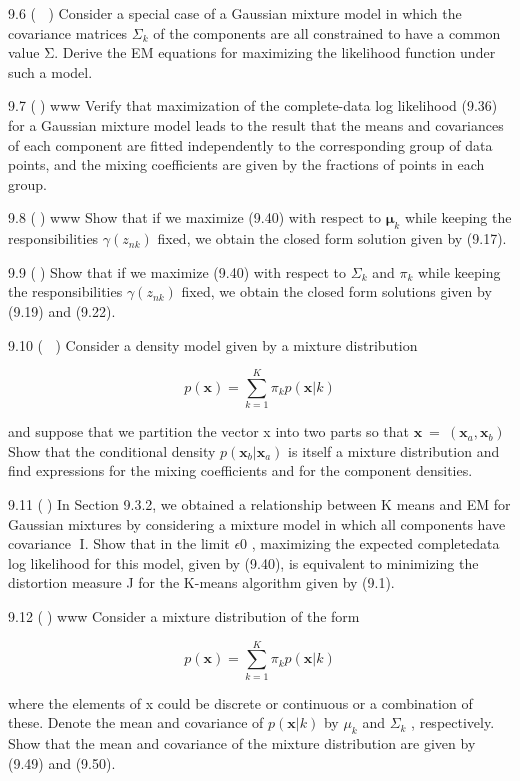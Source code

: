 \documentclass[
  10
]{article}
\begin{document}
9.6 ( ) Consider a special case of a Gaussian mixture model in which the
covariance matrices \(\Sigma _ { k }\) of the components are all
constrained to have a common value Σ. Derive the EM equations for
maximizing the likelihood function under such a model.

9.7 () www Verify that maximization of the complete-data log likelihood
(9.36) for a Gaussian mixture model leads to the result that the means
and covariances of each component are fitted independently to the
corresponding group of data points, and the mixing coefficients are
given by the fractions of points in each group.

9.8 () www Show that if we maximize (9.40) with respect to
\(\pmb { \mu } _ { k }\) while keeping the responsibilities
\(\gamma ( z _ { n k } )\) fixed, we obtain the closed form solution
given by (9.17).

9.9 () Show that if we maximize (9.40) with respect to
\(\Sigma _ { k }\) and \(\pi _ { k }\) while keeping the
responsibilities \(\gamma ( z _ { n k } )\) fixed, we obtain the closed
form solutions given by (9.19) and (9.22).

9.10 ( ) Consider a density model given by a mixture distribution

\[
p (\mathbf {x}) = \sum_ {k = 1} ^ {K} \pi_ {k} p (\mathbf {x} | k)\tag{9.81}
\]

and suppose that we partition the vector x into two parts so that
\(\mathbf { x } ~ = ~ \left( \mathbf { x } _ { a } , \mathbf { x } _ { b } \right)\)
Show that the conditional density
\(p ( \mathbf { x } _ { b } | \mathbf { x } _ { a } )\) is itself a
mixture distribution and find expressions for the mixing coefficients
and for the component densities.

9.11 () In Section 9.3.2, we obtained a relationship between K means and
EM for Gaussian mixtures by considering a mixture model in which all
components have covariance I. Show that in the limit \(\epsilon  0\) ,
maximizing the expected completedata log likelihood for this model,
given by (9.40), is equivalent to minimizing the distortion measure J
for the K-means algorithm given by (9.1).

9.12 () www Consider a mixture distribution of the form

\[
p (\mathbf {x}) = \sum_ {k = 1} ^ {K} \pi_ {k} p (\mathbf {x} | k)\tag{9.82}
\]

where the elements of x could be discrete or continuous or a combination
of these. Denote the mean and covariance of \(p ( \mathbf { x } | k )\)
by \(\mu _ { k }\) and \(\Sigma _ { k }\) , respectively. Show that the
mean and covariance of the mixture distribution are given by (9.49) and
(9.50).
\end{document}
